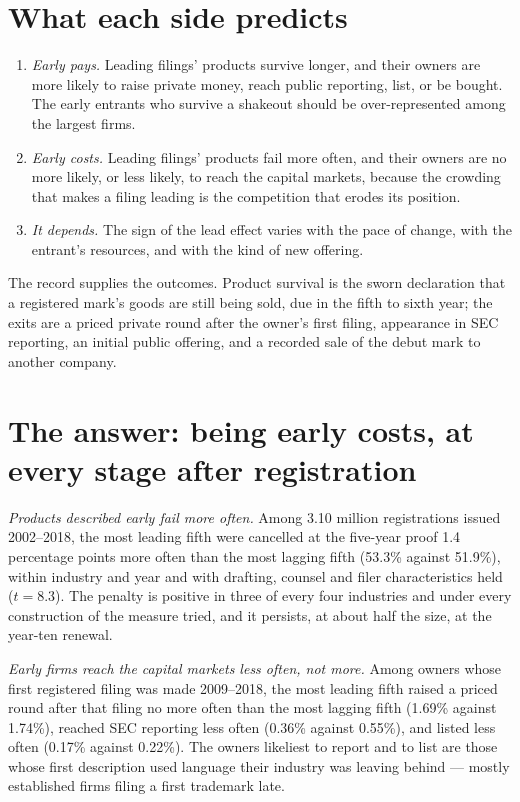 \section*{What each side predicts}

\begin{enumerate}
\item[\textbf{H1}] \emph{Early pays.} Leading filings' products survive
longer, and their owners are more likely to raise private money, reach
public reporting, list, or be bought. The early entrants who survive a shakeout
should be over-represented among the largest firms.
\item[\textbf{H2}] \emph{Early costs.} Leading filings' products fail
more often, and their owners are no more likely, or less likely, to
reach the capital markets, because the crowding that makes a filing
leading is the competition that erodes its position.
\item[\textbf{H3}] \emph{It depends.} The sign of the lead effect varies
with the pace of change, with the entrant's resources, and with
the kind of new offering.
\end{enumerate}

\noindent The record supplies the outcomes. Product survival is the
sworn declaration that a registered mark's goods are still being sold,
due in the fifth to sixth year; the exits are a priced private round
after the owner's first filing, appearance in SEC reporting, an initial
public offering, and a recorded sale of the debut mark to another
company.

\section*{The answer: being early costs, at every stage after registration}

\emph{Products described early fail more often.} Among 3.10 million
registrations issued 2002--2018, the most leading fifth were cancelled
at the five-year proof 1.4 percentage points more often than the most
lagging fifth (53.3\% against 51.9\%), within industry and year and
with drafting, counsel and filer characteristics held ($t = 8.3$). The
penalty is positive in three of every four industries and under every
construction of the measure tried, and it persists, at about half the
size, at the year-ten renewal.

\emph{Early firms reach the capital markets less often, not more.}
Among owners whose first registered filing was made 2009--2018, the
most leading fifth raised a priced round after that filing no more
often than the most lagging fifth (1.69\% against 1.74\%), reached SEC
reporting less often (0.36\% against 0.55\%), and listed less often
(0.17\% against 0.22\%). The owners likeliest to report and to list
are those whose first description used language their industry was
leaving behind --- mostly established firms filing a first trademark
late.

